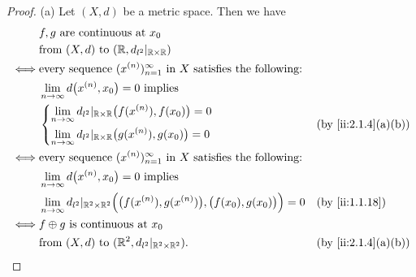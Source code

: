 \begin{proof}{(a)}
  Let \((X, d)\) be a metric space.
  Then we have
  \begin{align*}
         & f, g \text{ are continuous at } x_0                                                                                                             \\
         & \text{from } (X, d) \text{ to } (\R, d_{l^2}|_{\R \times \R})                                                                                   \\
    \iff & \text{every sequence } (x^{(n)})_{n = 1}^\infty \text{ in } X \text{ satisfies the following:}                                                  \\
         & \lim_{n \to \infty} d\big(x^{(n)}, x_0\big) = 0 \text{ implies }                                                                                \\
         & \begin{dcases}
             \lim_{n \to \infty} d_{l^2}|_{\R \times \R}\big(f(x^{(n)}), f(x_0)\big) = 0 \\
             \lim_{n \to \infty} d_{l^2}|_{\R \times \R}\big(g(x^{(n)}), g(x_0)\big) = 0
           \end{dcases}                                          &  & \by{ii:2.1.4}[a,b]                                                                   \\
    \iff & \text{every sequence } (x^{(n)})_{n = 1}^\infty \text{ in } X \text{ satisfies the following:}                                                  \\
         & \lim_{n \to \infty} d\big(x^{(n)}, x_0\big) = 0 \text{ implies }                                                                                \\
         & \lim_{n \to \infty} d_{l^2}|_{\R^2 \times \R^2}\Big(\big(f(x^{(n)}), g(x^{(n)})\big), \big(f(x_0), g(x_0)\big)\Big) = 0 &  & \by{ii:1.1.18}     \\
    \iff & f \oplus g \text{ is continuous at } x_0                                                                                                        \\
         & \text{from } (X, d) \text{ to } (\R^2, d_{l^2}|_{\R^2 \times \R^2}).                                                    &  & \by{ii:2.1.4}[a,b]
  \end{align*}
\end{proof}

